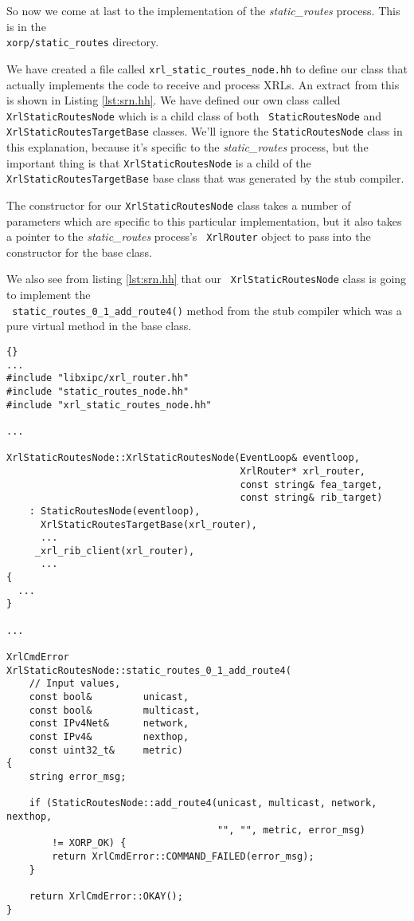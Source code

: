 \documentclass[11pt]{article}
\newcommand{\stt}{\tt\small}
\newcommand{\SRI}{{\it static\_routes}\xspace}
\begin{document}
So now we come at last to the implementation of the \SRI process.
This is in the \\
{\stt xorp/static\_routes} directory.  

We have created a file called {\stt xrl\_static\_routes\_node.hh} to
define our class that actually implements the code to receive and
process XRLs.  An extract from this is shown in Listing
\ref{lst:srn.hh}.  We have defined our own class called {\stt
XrlStaticRoutesNode} which is a child class of both {\stt
StaticRoutesNode} and {\stt XrlStaticRoutesTargetBase} classes.  We'll
ignore the {\stt StaticRoutesNode} class in this explanation, because
it's specific to the \SRI process, but the important thing is that
{\stt XrlStaticRoutesNode} is a child of the {\stt
XrlStaticRoutesTargetBase} base class that was generated by the stub
compiler.

The constructor for our {\stt XrlStaticRoutesNode} class takes a
number of parameters which are specific to this particular
implementation, but it also takes a pointer to the \SRI process's {\tt
XrlRouter} object to pass into the constructor for the base class.

We also see from listing \ref{lst:srn.hh} that our {\stt
XrlStaticRoutesNode} class is going to implement the \\ {\stt
static\_routes\_0\_1\_add\_route4()} method from the stub compiler
which was a pure virtual method in the base class.

\newpage
\begin{lstlisting}[caption={Extracts from {\stt xorp/static\_routes/xrl\_static\_routes\_node.cc} %
                                     \label{lst:srn.cc} } ]{}
...
#include "libxipc/xrl_router.hh"
#include "static_routes_node.hh"
#include "xrl_static_routes_node.hh"

...

XrlStaticRoutesNode::XrlStaticRoutesNode(EventLoop& eventloop,
                                         XrlRouter* xrl_router,
                                         const string& fea_target,
                                         const string& rib_target)
    : StaticRoutesNode(eventloop),
      XrlStaticRoutesTargetBase(xrl_router),
      ...
     _xrl_rib_client(xrl_router),
      ...
{
  ...
}

...

XrlCmdError
XrlStaticRoutesNode::static_routes_0_1_add_route4(
    // Input values,
    const bool&         unicast,
    const bool&         multicast,
    const IPv4Net&      network,
    const IPv4&         nexthop,
    const uint32_t&     metric)
{
    string error_msg;

    if (StaticRoutesNode::add_route4(unicast, multicast, network, nexthop,
                                     "", "", metric, error_msg)
        != XORP_OK) {
        return XrlCmdError::COMMAND_FAILED(error_msg);
    }

    return XrlCmdError::OKAY();
}
\end{lstlisting}
\end{document}
